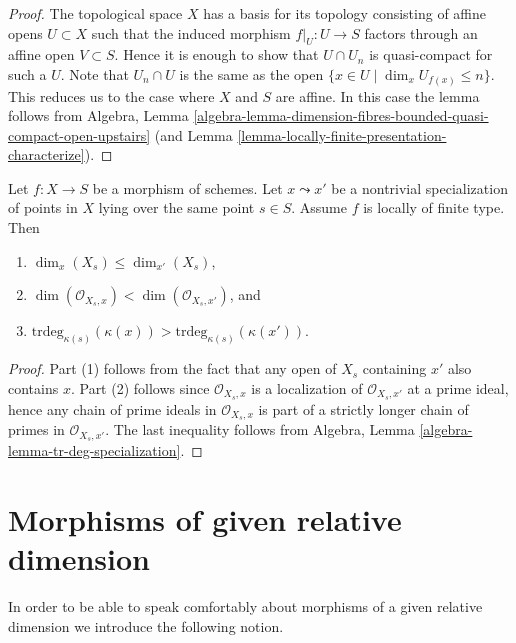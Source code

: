 \begin{proof}
The topological space $X$ has a basis for its topology consisting of
affine opens $U \subset X$ such that the induced morphism
$f|_U : U \to S$ factors through an affine open $V \subset S$. Hence
it is enough to show that $U \cap U_n$ is quasi-compact for such a $U$.
Note that $U_n \cap U$ is the same as the open
$\{x \in U \mid \dim_x U_{f(x)} \leq n\}$. This reduces us to the case
where $X$ and $S$ are affine. In this case the lemma follows from
Algebra,
Lemma \ref{algebra-lemma-dimension-fibres-bounded-quasi-compact-open-upstairs}
(and Lemma \ref{lemma-locally-finite-presentation-characterize}).
\end{proof}

\begin{lemma}
\label{lemma-dimension-fibre-specialization}
Let $f : X \to S$ be a morphism of schemes.
Let $x \leadsto x'$ be a nontrivial specialization of points in $X$
lying over the same point $s \in S$. Assume $f$ is locally of finite type.
Then
\begin{enumerate}
\item $\dim_x(X_s) \leq \dim_{x'}(X_s)$,
\item $\dim(\mathcal{O}_{X_s, x}) < \dim(\mathcal{O}_{X_s, x'})$, and
\item $\text{trdeg}_{\kappa(s)}(\kappa(x)) >
\text{trdeg}_{\kappa(s)}(\kappa(x'))$.
\end{enumerate}
\end{lemma}

\begin{proof}
Part (1) follows from the fact that any open of $X_s$ containing $x'$
also contains $x$. Part (2) follows since $\mathcal{O}_{X_s, x}$ is a
localization of $\mathcal{O}_{X_s, x'}$ at a prime ideal, hence any chain
of prime ideals in $\mathcal{O}_{X_s, x}$ is part of a strictly longer
chain of primes in $\mathcal{O}_{X_s, x'}$. The last inequality follows from
Algebra, Lemma \ref{algebra-lemma-tr-deg-specialization}.
\end{proof}






\section{Morphisms of given relative dimension}
\label{section-relative-dimension}

\noindent
In order to be able to speak comfortably about morphisms of a
given relative dimension we introduce the following notion.


